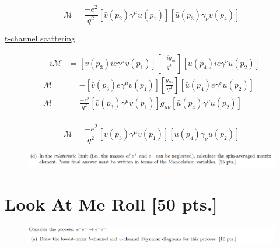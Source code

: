 \documentclass[11pt]{article}
\theoremstyle{definition}
\numberwithin{equation}{section}
\begin{document}
\begin{equation}
\boxed{
    \mathcal{M}= \frac{-e^2}{q^2} [\bar{v}(p_2)\gamma^{\mu}u(p_1)]
    [\bar{u}(p_3)\gamma_{\nu}v(p_4)]
}
\end{equation}

\underline{t-channel scattering}

\begin{align}
    -i\mathcal{M} &= [\bar{v}(p_3)ie\gamma^{\mu}v(p_1)] 
    \left[ \frac{-ig_{\mu\nu}}{q^2} \right]
    [\bar{u}(p_4)ie\gamma^{\nu}u(p_2)]\\
    \mathcal{M} &= -[\bar{v}(p_3)e\gamma^{\mu}v(p_1)] 
    \left[ \frac{g_{\mu\nu}}{q^2} \right]
    [\bar{u}(p_4)e\gamma^{\nu}u(p_2)]\\
    \mathcal{M} &= \frac{-e^2}{q^2} [\bar{v}(p_3)\gamma^{\mu}v(p_1)]
    g_{\mu\nu}[\bar{u}(p_4)\gamma^{\nu}u(p_2)]\\
\end{align}

\begin{equation}
\boxed{
    \mathcal{M}= \frac{-e^2}{q^2} [\bar{v}(p_3)\gamma^{\mu}v(p_1)]
    [\bar{u}(p_4)\gamma_{\nu}u(p_2)]
}
\end{equation}
\newpage


\begin{figure}[H]
    \centering
    \includegraphics[scale = 0.4]{1d.png}
\end{figure}


\newpage


\section{\textbf{Look At Me Roll} [50 pts.]}


\begin{figure}[H]
    \centering
    \includegraphics[scale = 0.4]{2a.png}
\end{figure}
\end{document}

